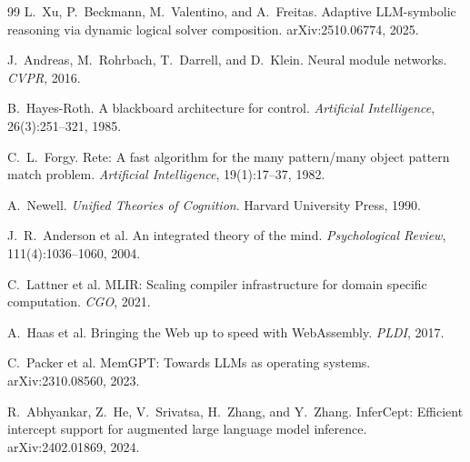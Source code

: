 \documentclass[11pt]{article}
\begin{document}
\begin{thebibliography}{99}
L.~Xu, P.~Beckmann, M.~Valentino, and A.~Freitas.
Adaptive LLM-symbolic reasoning via dynamic logical solver composition.
arXiv:2510.06774, 2025.

J.~Andreas, M.~Rohrbach, T.~Darrell, and D.~Klein.
Neural module networks.  \emph{CVPR}, 2016.

B.~Hayes-Roth.
A blackboard architecture for control.
\emph{Artificial Intelligence}, 26(3):251--321, 1985.

C.~L.~Forgy.
Rete: A fast algorithm for the many pattern/many object pattern match problem.
\emph{Artificial Intelligence}, 19(1):17--37, 1982.

A.~Newell.
\emph{Unified Theories of Cognition}.
Harvard University Press, 1990.

J.~R.~Anderson et al.
An integrated theory of the mind.
\emph{Psychological Review}, 111(4):1036--1060, 2004.

C.~Lattner et al.
MLIR: Scaling compiler infrastructure for domain specific computation.
\emph{CGO}, 2021.

A.~Haas et al.
Bringing the Web up to speed with WebAssembly.
\emph{PLDI}, 2017.

C.~Packer et al.
MemGPT: Towards LLMs as operating systems.
arXiv:2310.08560, 2023.

R.~Abhyankar, Z.~He, V.~Srivatsa, H.~Zhang, and Y.~Zhang.
InferCept: Efficient intercept support for augmented large language model
inference.  arXiv:2402.01869, 2024.

\end{thebibliography}
\end{document}
